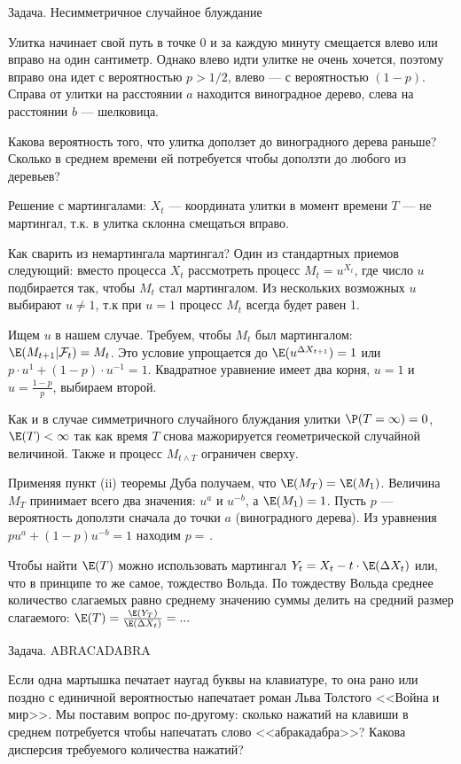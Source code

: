 Задача. Несимметричное случайное блуждание 

Улитка начинает свой путь в точке 0 и за каждую минуту смещается влево или вправо на один сантиметр. Однако влево идти улитке не очень хочется, поэтому вправо она идет с вероятностью $p>1/2$, влево --- с вероятностью $(1-p)$. Справа от улитки на расстоянии $a$ находится виноградное дерево, слева на расстоянии $b$ --- шелковица.

Какова вероятность того, что улитка доползет до виноградного дерева раньше? Сколько в среднем времени ей потребуется чтобы доползти до любого из деревьев?

Решение с мартингалами: $X_{t}$ --- координата улитки в момент времени $T$ --- не мартингал, т.к. в улитка склонна смещаться вправо.

Как сварить из немартингала мартингал? Один из стандартных приемов следующий: вместо процесса $X_{t}$ рассмотреть процесс $M_{t}=u^{X_{t}}$, где число $u$ подбирается так, чтобы $M_{t}$ стал мартингалом. Из нескольких возможных $u$ выбирают $u\neq 1$, т.к при $u=1$ процесс $M_{t}$ всегда будет равен 1.

Ищем $u$ в нашем случае. Требуем, чтобы $M_{t}$ был мартингалом: $\E(M_{t+1}|\mathcal{F}_{t})=M_{t}$. Это условие упрощается до $\E(u^{\Delta{X}_{t+1}})=1$ или $p\cdot u^{1}+(1-p)\cdot u^{-1}=1$.
Квадратное уравнение имеет два корня, $u=1$ и $u=\frac{1-p}{p}$, выбираем второй.

Как и в случае симметричного случайного блуждания улитки $\P(T=\infty)=0$, $\E(T)<\infty$ так как время $T$ снова мажорируется геометрической случайной величиной. Также и процесс $M_{t\wedge T}$ ограничен сверху.

Применяя пункт (ii) теоремы Дуба получаем, что $\E(M_{T})=\E(M_{1})$. Величина $M_{T}$ принимает всего два значения: $u^{a}$ и $u^{-b}$, а $\E(M_{1})=1$. Пусть $p$ --- вероятность доползти сначала до точки $a$ (виноградного дерева). Из уравнения $pu^{a}+(1-p)u^{-b}=1$ находим $p=\frac{}{}$.

Чтобы найти $\E(T)$ можно использовать мартингал $Y_{t}=X_{t}-t\cdot \E(\Delta X_{t})$ или, что в принципе то же самое, тождество Вольда. По тождеству Вольда среднее количество слагаемых равно среднему значению суммы делить на средний размер слагаемого: $\E(T)=\frac{\E(Y_{T})}{\E(\Delta X_{t})}=...$ 


Задача. ABRACADABRA \cite{ross:scp}\cite{williams:pwm} 

Если одна мартышка печатает наугад буквы на клавиатуре, то она рано или поздно с единичной вероятностью напечатает роман Льва Толстого <<Война и мир>>. Мы поставим вопрос по-другому: сколько нажатий на клавиши в среднем потребуется чтобы напечатать слово <<абракадабра>>? Какова дисперсия требуемого количества нажатий?

